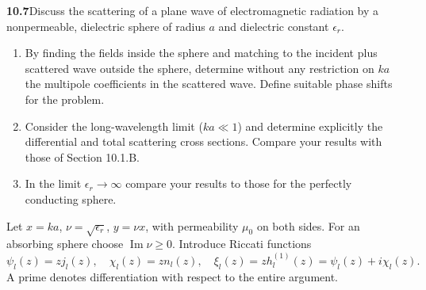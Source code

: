 \par\bigskip
\noindent\textbf{10.7}\quad Discuss the scattering of a plane wave of electromagnetic radiation by a nonpermeable, dielectric sphere of radius $a$ and dielectric constant $\epsilon_{r}$.
\begin{enumerate}
\item[(a)] By finding the fields inside the sphere and matching to the incident plus scattered wave outside the sphere, determine without any restriction on $ka$ the multipole coefficients in the scattered wave. Define suitable phase shifts for the problem.
\item[(b)] Consider the long-wavelength limit ($ka\ll1$) and determine explicitly the differential and total scattering cross sections. Compare your results with those of Section 10.1.B.
\item[(c)] In the limit $\epsilon_{r}\to\infty$ compare your results to those for the perfectly conducting sphere.
\end{enumerate}
\solution
Let $x=ka$, $\nu=\sqrt{\epsilon_r}$, $y=\nu x$, with permeability
$\mu_0$ on both sides. For an absorbing sphere choose
$\operatorname{Im}\nu\geq0$. Introduce Riccati functions
\[
\psi_l(z)=zj_l(z),\quad \chi_l(z)=zn_l(z),\quad
\xi_l(z)=zh_l^{(1)}(z)=\psi_l(z)+i\chi_l(z).
\]
A prime denotes differentiation with respect to the entire argument.

